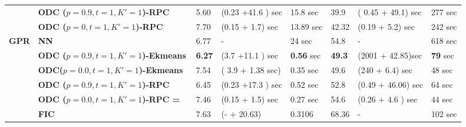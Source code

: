 \begin{table*}[t!]
{\begin{tabular}{|l|l|lll|lll|}
      &  \textbf{ODC ($p= 0.9, t=1, K'=1$)-RPC} & 5.60      &      (0.23 +41.6 ) sec  &   15.8 sec  &   39.9  &    ( 0.45 + 49.1) sec     & 277 sec\\%
  &  \textbf{ODC ($p= 0, t=1, K'=1$)-RPC} &   7.70    &   (0.15 + 1.7) sec   &   13.89 sec  &  42.32    &  (0.19 + 5.2)      sec &  242 sec\\%
      \hline
  \textbf{GPR}  & \textbf{NN} & 6.77      &   -    &  24 sec     &   54.8    &      - &    618  sec \\%
   & \textbf{ODC ($p= 0.9, t=1 , K'=1$)-Ekmeans} &  \textbf{6.27}      &  (3.7 +11.1 ) sec  &       \textbf{0.56}  sec & \textbf{49.3}  &   (2001 + 42.85)sec & \textbf{79} sec \\%
   & \textbf{ODC($p= 0.0, t=1 , K'=1$)-Ekmeans} & 7.54      &   ( 3.9 + 1.38 sec) &    0.35 sec   & 49.6  &  (240 + 6.4) sec  &  48 sec\\%
  & \textbf{ODC ($p= 0.9, t=1 , K'=1$)-RPC} &  6.45      &  (0.23 +17.3 ) sec  &       0.52  sec & 52.8  & (0.49 + 46.06) sec     &  64 sec\\%
    & \textbf{ODC ($p= 0.0, t=1 , K'=1$)-RPC  = ~\cite{Chalupka:2013}} &   7.46    &   (0.15 + 1.5) sec &    0.27 sec   & 54.6  &  (0.26 + 4.6 ) sec & 44 sec\\%
    & \textbf{FIC ~\cite{fic06}} &   7.63   &   (- + 20.63)   &    0.3106     &   68.36   &  -     & 102  sec\\%
    \hline
    \end{tabular}}%
  \label{tab:tblRes}%
  \vspace{-5mm}
\end{table*}%

